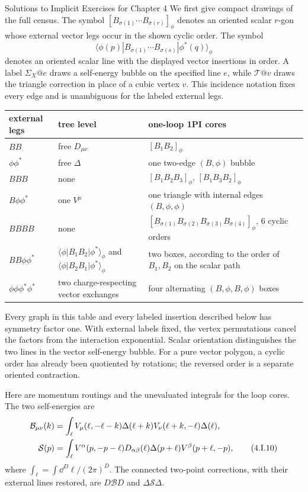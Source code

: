 \begin{bankssolutions}{Solutions to Implicit Exercises for Chapter 4}
We first give compact drawings of the full census.  The symbol
$[B_{\sigma(1)}\cdots B_{\sigma(r)}]_\phi$ denotes an oriented scalar
$r$-gon whose external vector legs occur in the shown cyclic order.  The
symbol
\begin{equation*}
 \langle\phi(p)|B_{\sigma(1)}\cdots
 B_{\sigma(s)}|\phi^*(q)\rangle_\phi
\end{equation*}
denotes an oriented scalar line with the displayed vector insertions in
order.  A label $\Sigma_X@e$ draws a self-energy bubble on the specified
line $e$, while $\mathcal T@v$ draws the triangle correction in place of a
cubic vertex $v$.  This incidence notation fixes every edge and is
unambiguous for the labeled external legs.

\begin{center}
\small
\begin{tabular}{@{}p{.14\linewidth}p{.35\linewidth}p{.42\linewidth}@{}}
external legs & tree level & one-loop 1PI cores \\ \hline
$BB$ & free $D_{\mu\nu}$
 & $[B_1B_2]_\phi$ \\
$\phi\phi^*$ & free $\Delta$
 & one two-edge $(B,\phi)$ bubble \\
$BBB$ & none
 & $[B_1B_2B_3]_\phi$, $[B_1B_3B_2]_\phi$ \\
$B\phi\phi^*$ & one $V^\mu$
 & one triangle with internal edges $(B,\phi,\phi)$ \\
$BBBB$ & none
 & $[B_{\sigma(1)}B_{\sigma(2)}B_{\sigma(3)}B_{\sigma(4)}]_\phi$,
   $6$ cyclic orders \\
$BB\phi\phi^*$
 & $\langle\phi|B_1B_2|\phi^*\rangle_\phi$ and
   $\langle\phi|B_2B_1|\phi^*\rangle_\phi$
 & two boxes, according to the order of $B_1,B_2$ on the scalar path \\
$\phi\phi\phi^*\phi^*$
 & two charge-respecting vector exchanges
 & four alternating $(B,\phi,B,\phi)$ boxes
\end{tabular}
\end{center}

Every graph in this table and every labeled insertion described below has
symmetry factor one.  With external labels fixed, the vertex permutations
cancel the factors from the interaction exponential.  Scalar orientation
distinguishes the two lines in the vector self-energy bubble.  For a pure
vector polygon, a cyclic order has already been quotiented by rotations;
the reversed order is a separate oriented contraction.

Here are momentum routings and the unevaluated integrals for the loop cores.
The two self-energies are
\begin{align*}
 \mathcal B_{\mu\nu}(k)
 &=\int_\ell
 V_\mu(\ell,-\ell-k)\Delta(\ell+k)
 V_\nu(\ell+k,-\ell)\Delta(\ell),\notag\\
 \mathcal S(p)
 &=\int_\ell
 V^\alpha(p,-p-\ell)D_{\alpha\beta}(\ell)
 \Delta(p+\ell)V^\beta(p+\ell,-p),
 \tag{4.I.10}
\end{align*}
where $\int_\ell=\int\dd^D\ell/(2\pi)^D$.  The connected two-point
corrections, with their external lines restored, are
$D\mathcal B D$ and $\Delta\mathcal S\Delta$.


\end{bankssolutions}
